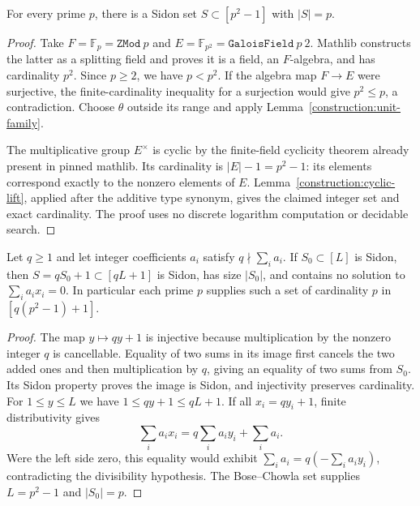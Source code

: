 \begin{theorem}
\label{construction:bose-chowla}
\leanok
For every prime $p$, there is a Sidon set $S\subset[p^2-1]$ with $|S|=p$.
\end{theorem}
\begin{proof}
Take $F=\mathbb F_p=\texttt{ZMod}\ p$ and
$E=\mathbb F_{p^2}=\texttt{GaloisField}\ p\ 2$.
Mathlib constructs the latter as a splitting field and proves it is a
field, an $F$-algebra, and has cardinality $p^2$.
Since $p\ge2$, we have $p<p^2$.
If the algebra map $F\to E$ were surjective, the finite-cardinality
inequality for a surjection would give $p^2\le p$, a contradiction.
Choose $\theta$ outside its range and apply
Lemma~\ref{construction:unit-family}.

The multiplicative group $E^\times$ is cyclic by the finite-field cyclicity
theorem already present in pinned mathlib.  Its cardinality is
$|E|-1=p^2-1$: its elements correspond exactly to the nonzero elements of
$E$.  Lemma~\ref{construction:cyclic-lift}, applied after the additive type
synonym, gives the claimed integer set and exact cardinality.
The proof uses no discrete logarithm computation or decidable search.
\end{proof}

\begin{lemma}
\label{construction:affine-obstruction}
\leanok
Let $q\ge1$ and let integer coefficients $a_i$ satisfy
$q\nmid\sum_i a_i$.  If $S_0\subset[L]$ is Sidon, then
$S=qS_0+1\subset[qL+1]$ is Sidon, has size $|S_0|$, and contains no
solution to $\sum_i a_i x_i=0$.
In particular each prime $p$ supplies such a set of cardinality $p$ in
$[q(p^2-1)+1]$.
\end{lemma}
\begin{proof}
The map $y\mapsto qy+1$ is injective because multiplication by the nonzero
integer $q$ is cancellable.  Equality of two sums in its image first
cancels the two added ones and then multiplication by $q$, giving an
equality of two sums from $S_0$.  Its Sidon property proves the image is
Sidon, and injectivity preserves cardinality.
For $1\le y\le L$ we have $1\le qy+1\le qL+1$.
If all $x_i=qy_i+1$, finite distributivity gives
\[
 \sum_i a_i x_i=q\sum_i a_i y_i+\sum_i a_i.
\]
Were the left side zero, this equality would exhibit
$\sum_i a_i=q(-\sum_i a_i y_i)$, contradicting the divisibility hypothesis.
The Bose--Chowla set supplies $L=p^2-1$ and $|S_0|=p$.
\end{proof}

